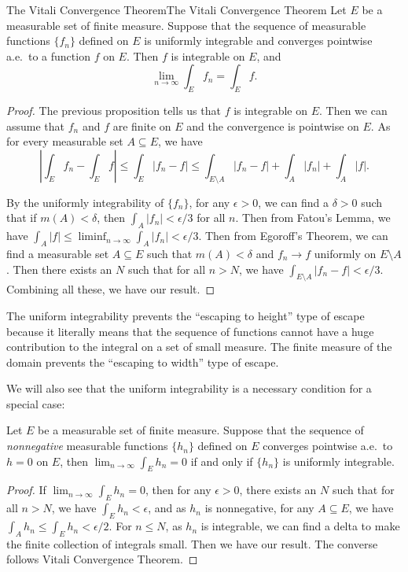 \documentclass[../main.tex]{subfiles}
\begin{document}
\begin{theorem}{The Vitali Convergence Theorem}{The Vitali Convergence Theorem}
	Let $E$ be a measurable set of finite measure. Suppose that the sequence of measurable functions $\{ f_n \}$ defined on $E$ is uniformly integrable and converges pointwise a.e.\ to a function $f$ on $E$. Then $f$ is integrable on $E$, and
	\begin{equation}
		\lim_{n \to \infty} \int_E f_n = \int_E f.
	\end{equation}
\end{theorem}
\begin{proof}
	The previous proposition tells us that $f$ is integrable on $E$. Then we can assume that $f_n$ and $f$ are finite on $E$ and the convergence is pointwise on $E$. As for every measurable set $A \subseteq E$, we have
	\begin{equation*}
		\left| \int_E f_n - \int_E f \right| \leq \int_E |f_n - f| \leq \int_{E \setminus A} |f_n - f| + \int_A |f_n| + \int_A |f|.
	\end{equation*}

	By the uniformly integrability of $\{ f_n \}$, for any $\epsilon > 0$, we can find a $\delta > 0$ such that if $m(A) < \delta$, then $\int_A |f_n| < \epsilon / 3$ for all $n$. Then from Fatou's Lemma, we have $\int_A |f| \leq \liminf_{n \to \infty} \int_A |f_n| < \epsilon / 3$. Then from Egoroff's Theorem, we can find a measurable set $A \subseteq E$ such that $m(A) < \delta$ and $f_n \to f$ uniformly on $E \setminus A$. Then there exists an $N$ such that for all $n > N$, we have $\int_{E \setminus A} |f_n - f| < \epsilon / 3$. Combining all these, we have our result.
\end{proof}

\begin{remark}
	The uniform integrability prevents the ``escaping to height'' type of escape because it literally means that the sequence of functions cannot have a huge contribution to the integral on a set of small measure. The finite measure of the domain prevents the ``escaping to width'' type of escape.
\end{remark}

We will also see that the uniform integrability is a necessary condition for a special case:

\begin{theorem}{}{}
	Let $E$ be a measurable set of finite measure. Suppose that the sequence of \emph{nonnegative} measurable functions $\{ h_n \}$ defined on $E$ converges pointwise a.e.\ to $h = 0$ on $E$, then $\lim_{n \to \infty} \int_E h_n = 0$ if and only if $\{ h_n \}$ is uniformly integrable.
\end{theorem}
\begin{proof}
	If $\lim_{n \to \infty} \int_E h_n = 0$, then for any $\epsilon > 0$, there exists an $N$ such that for all $n > N$, we have $\int_E h_n < \epsilon$, and as $h_n$ is nonnegative, for any $A \subseteq E$, we have $\int_A h_n \leq \int_E h_n < \epsilon / 2$. For $n \leq N$, as $h_n$ is integrable, we can find a delta to make the finite collection of integrals small. Then we have our result. The converse follows Vitali Convergence Theorem.
\end{proof}
\end{document}
